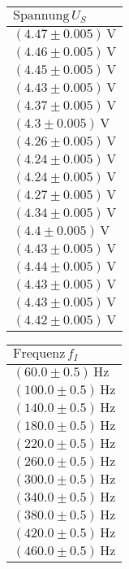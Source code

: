\documentclass[a4paper,10pt]{scrbook}
\begin{document}
\begin{table}[htb]
\centering
\begin{tabular}{|l|}
\hline
$\text{Spannung}\,U_S$  \\ \hline
$(4.47\pm 0.005)\,\mathrm{V}$
\\ \hline
$(4.46\pm 0.005)\,\mathrm{V}$
\\ \hline
$(4.45\pm 0.005)\,\mathrm{V}$
\\ \hline
$(4.43\pm 0.005)\,\mathrm{V}$
\\ \hline
$(4.37\pm 0.005)\,\mathrm{V}$
\\ \hline
$(4.3\pm 0.005)\,\mathrm{V}$
\\ \hline
$(4.26\pm 0.005)\,\mathrm{V}$
\\ \hline
$(4.24\pm 0.005)\,\mathrm{V}$
\\ \hline
$(4.24\pm 0.005)\,\mathrm{V}$
\\ \hline
$(4.27\pm 0.005)\,\mathrm{V}$
\\ \hline
$(4.34\pm 0.005)\,\mathrm{V}$
\\ \hline
$(4.4\pm 0.005)\,\mathrm{V}$
\\ \hline
$(4.43\pm 0.005)\,\mathrm{V}$
\\ \hline
$(4.44\pm 0.005)\,\mathrm{V}$
\\ \hline
$(4.43\pm 0.005)\,\mathrm{V}$
\\ \hline
$(4.43\pm 0.005)\,\mathrm{V}$
\\ \hline
$(4.42\pm 0.005)\,\mathrm{V}$
\\ \hline
\end{tabular}
\end{table}
\begin{table}[htb]
\centering
\begin{tabular}{|l|}
\hline
$\text{Frequenz}\,f_I$  \\ \hline
$(60.0\pm 0.5)\,\mathrm{Hz}$
\\ \hline
$(100.0\pm 0.5)\,\mathrm{Hz}$
\\ \hline
$(140.0\pm 0.5)\,\mathrm{Hz}$
\\ \hline
$(180.0\pm 0.5)\,\mathrm{Hz}$
\\ \hline
$(220.0\pm 0.5)\,\mathrm{Hz}$
\\ \hline
$(260.0\pm 0.5)\,\mathrm{Hz}$
\\ \hline
$(300.0\pm 0.5)\,\mathrm{Hz}$
\\ \hline
$(340.0\pm 0.5)\,\mathrm{Hz}$
\\ \hline
$(380.0\pm 0.5)\,\mathrm{Hz}$
\\ \hline
$(420.0\pm 0.5)\,\mathrm{Hz}$
\\ \hline
$(460.0\pm 0.5)\,\mathrm{Hz}$
\\ \hline
\end{tabular}
\end{table}
\end{document}
